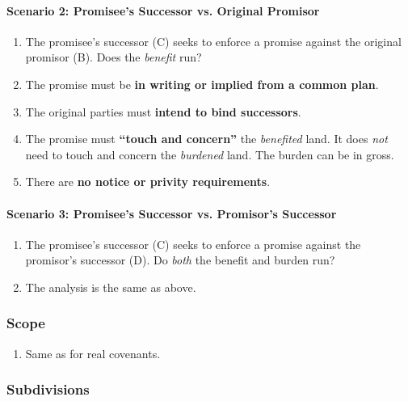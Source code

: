 \paragraph{Scenario 2: Promisee's Successor vs. Original Promisor}

\begin{enumerate}
    \item The promisee's successor (C) seeks to enforce a promise against the 
    original promisor (B). Does the \emph{benefit} run?
    \item The promise must be \textbf{in writing or implied from a common 
    plan}.
    \item The original parties must \textbf{intend to bind successors}.
    \item The promise must \textbf{``touch and concern''} the \emph{benefited} 
    land. It does \emph{not} need to touch and concern the \emph{burdened} 
    land. The burden can be in gross. %
    \item There are \textbf{no notice or privity requirements}.
\end{enumerate}

\paragraph{Scenario 3: Promisee's Successor vs. Promisor's Successor}

\begin{enumerate}
    \item The promisee's successor (C) seeks to enforce a promise against the 
    promisor's successor (D). Do \emph{both} the benefit and burden run?
    \item The analysis is the same as above.
\end{enumerate}

\subsubsection{Scope}

\begin{enumerate}
    \item Same as for real covenants.
\end{enumerate}

\subsubsection{Subdivisions}


